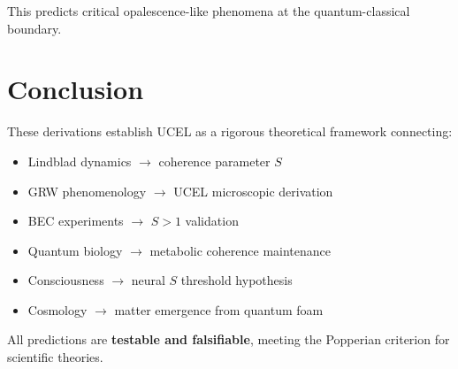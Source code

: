 \documentclass[12pt,a4paper]{article}
\begin{document}
This predicts critical opalescence-like phenomena at the quantum-classical boundary.

\section{Conclusion}

These derivations establish UCEL as a rigorous theoretical framework connecting:
\begin{itemize}
    \item Lindblad dynamics $\rightarrow$ coherence parameter $S$
    \item GRW phenomenology $\rightarrow$ UCEL microscopic derivation
    \item BEC experiments $\rightarrow$ $S > 1$ validation
    \item Quantum biology $\rightarrow$ metabolic coherence maintenance
    \item Consciousness $\rightarrow$ neural $S$ threshold hypothesis
    \item Cosmology $\rightarrow$ matter emergence from quantum foam
\end{itemize}

All predictions are \textbf{testable and falsifiable}, meeting the Popperian criterion for scientific theories.
\end{document}
